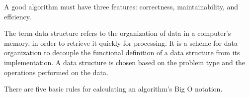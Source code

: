 \begin{mdframed}[style=theorem, frametitle={Algorithm Features}]
	A good algorithm must have three features: correctness, maintainability, and
effciency.
\end{mdframed}

\begin{mdframed}[style=important, frametitle={Data Structures}]
The term data structure refers to the organization of data in a
computer's memory, in order to retrieve it quickly for processing.
It is a scheme for data organization to decouple the functional
definition of a data structure from its implementation. A data
structure is chosen based on the problem type and the
operations performed on the data.
\end{mdframed}

There are five basic rules for calculating an algorithm’s Big O notation.

